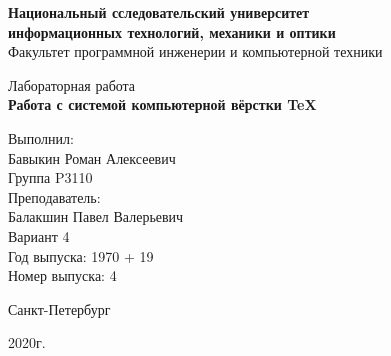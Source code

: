 \thispagestyle{empty}
\begin{center}
    {\bfseries Национальный сследовательский университет \\
    информационных технологий, механики и оптики}\\
    Факультет программной инженерии и компьютерной техники

    \vspace{20em}

    {\large Лабораторная работа }\\
    {\Large \textbf{Работа с системой компьютерной вёрстки \TeX}}
\end{center}

\vspace{15em}

\begin{flushright}
    Выполнил:\\
    Бавыкин Роман Алексеевич\\
    Группа P3110\\
    Преподаватель:\\
    Балакшин Павел Валерьевич\\
    Вариант 4\\
    Год выпуска: 1970 + 19\\
    Номер выпуска: 4
\end{flushright}

\vspace{\fill}

\begin{center}
Санкт-Петербург

2020г.
\end{center}
